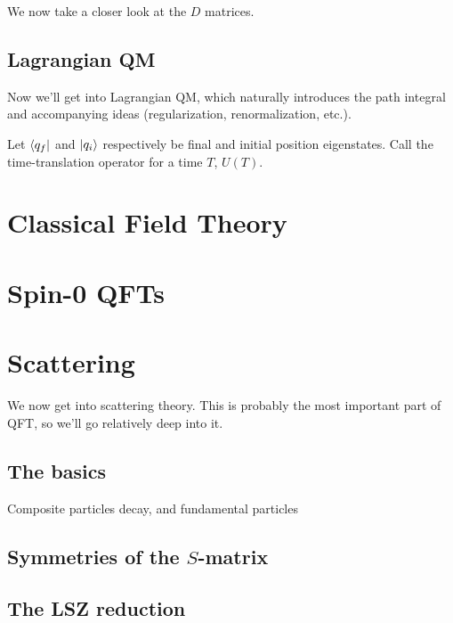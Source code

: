 \documentclass[11pt]{article}
\begin{document}
We now take a closer look at the $D$ matrices. 

\subsection{Lagrangian QM}

Now we'll get into Lagrangian QM, which naturally introduces
the path integral and accompanying ideas (regularization, renormalization,
etc.).

\begin{iidea}
    Let $\langle q_f\rvert$ and $\lvert q_i\rangle$ respectively be final
    and initial position eigenstates. Call the time-translation
    operator for a time $T$, $U(T)$. 
\end{iidea}


\section{Classical Field Theory}

\section{Spin-0 QFTs}

\section{Scattering}

We now get into scattering theory. This is probably the most
important part of QFT, so we'll go relatively deep into it.

\subsection{The basics}

Composite particles decay, and fundamental particles 

\subsection{Symmetries of the $S$-matrix}

\subsection{The LSZ reduction}
\end{document}
